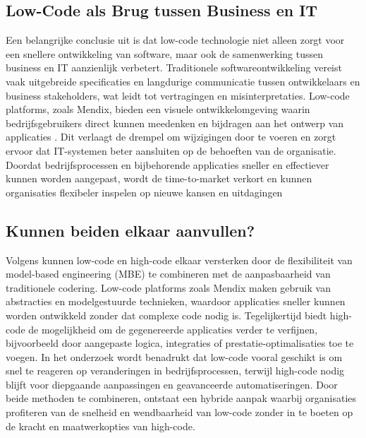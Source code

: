 \subsection{Low-Code als Brug tussen Business en IT}
Een belangrijke conclusie uit \textcite{Krouwel_2022} is dat low-code technologie niet alleen zorgt voor een snellere ontwikkeling van software, maar ook de samenwerking tussen business en IT aanzienlijk verbetert. Traditionele softwareontwikkeling vereist vaak uitgebreide specificaties en langdurige communicatie tussen ontwikkelaars en business stakeholders, wat leidt tot vertragingen en misinterpretaties. Low-code platforms, zoals Mendix, bieden een visuele ontwikkelomgeving waarin bedrijfsgebruikers direct kunnen meedenken en bijdragen aan het ontwerp van applicaties \autocite{Mendix}. Dit verlaagt de drempel om wijzigingen door te voeren en zorgt ervoor dat IT-systemen beter aansluiten op de behoeften van de organisatie. Doordat bedrijfsprocessen en bijbehorende applicaties sneller en effectiever kunnen worden aangepast, wordt de time-to-market verkort en kunnen organisaties flexibeler inspelen op nieuwe kansen en uitdagingen

\subsection{Kunnen beiden elkaar aanvullen?}
Volgens \textcite{Krouwel_2022} kunnen low-code en high-code elkaar versterken door de flexibiliteit van model-based engineering (MBE) te combineren met de aanpasbaarheid van traditionele codering. Low-code platforms zoals Mendix maken gebruik van abstracties en modelgestuurde technieken, waardoor applicaties sneller kunnen worden ontwikkeld zonder dat complexe code nodig is. Tegelijkertijd biedt high-code de mogelijkheid om de gegenereerde applicaties verder te verfijnen, bijvoorbeeld door aangepaste logica, integraties of prestatie-optimalisaties toe te voegen. In het onderzoek wordt benadrukt dat low-code vooral geschikt is om snel te reageren op veranderingen in bedrijfsprocessen, terwijl high-code nodig blijft voor diepgaande aanpassingen en geavanceerde automatiseringen. Door beide methoden te combineren, ontstaat een hybride aanpak waarbij organisaties profiteren van de snelheid en wendbaarheid van low-code zonder in te boeten op de kracht en maatwerkopties van high-code.

